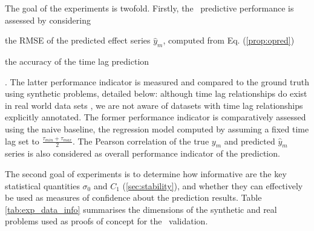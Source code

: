 The goal of the experiments is twofold. Firstly, the \XX\ predictive performance is assessed by 
considering 
%
\begin{enumerate*} 
  \item the RMSE of the predicted effect series $\hat y_m$, computed from Eq. (\ref{prop:opred})  
  \item the accuracy of the time lag prediction 
\end{enumerate*}. 
%
The latter performance indicator is measured and compared to the ground truth using synthetic 
problems, detailed below: although time lag relationships do exist in real world data sets 
\citep{doi:10.1002/jgra.50429,ZHOU2006195}, we are not aware of datasets with time lag 
relationships explicitly annotated. The former performance indicator is comparatively assessed 
using the naive baseline, the regression model computed by assuming a fixed time lag set to 
$\frac{\tau_{min}+\tau_{max}}{2}$. The Pearson correlation of the true $y_m$ and predicted 
$\hat y_m$ series is also considered as overall performance indicator of the prediction.

The second goal of experiments is to determine how informative are the key statistical quantities 
$\sigma_0$ and $C_1$ (\cref{sec:stability}), and whether they can effectively be used as 
measures of confidence about the prediction results. Table \ref{tab:exp_data_info} summarises the 
dimensions of the synthetic and real problems used as proofs of concept for the \XX\ validation. 

